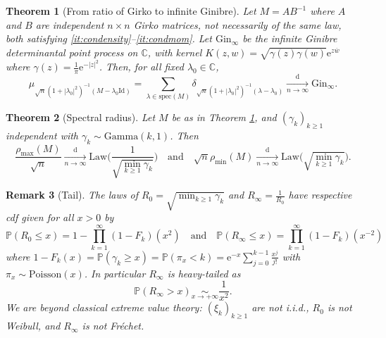 \documentclass[10pt,reqno]{amsart}
\newcommand{\dd}{\mathrm{d}}
\newcommand{\<}{\langle}
\renewcommand{\>}{\rangle}
\numberwithin{equation}{section}
\newtheorem{theorem}{Theorem}[section]%
\newtheorem{remark}[theorem]{Remark}%
\begin{document}
\begin{theorem}[From ratio of Girko to infinite Ginibre]\label{th:spherical:girko:gininf}
 Let $M=AB^{-1}$ where $A$ and $B$ are independent $n\times n$ Girko matrices, not necessarily of the same law, both satisfying \ref{it:condensity}--\ref{it:condmom}. Let $\mathrm{Gin}_\infty$ be the infinite Ginibre determinantal point process on $\mathbb{C}$, with kernel 
 $K(z,w)=\sqrt{\gamma(z)\gamma(w)}\mathrm{e}^{z\overline{w}}$ where $\gamma(z)=\frac{1}{\pi}\mathrm{e}^{-|z|^2}$. 
 Then, for all fixed $\lambda_0 \in \mathbb C$, %
    \[
    \mu_{\sqrt{n}(1+|\lambda_0|^2)^{-1}(M-\lambda_0\mathrm{Id})}=\sum_{\lambda\in\mathrm{spec}(M)}\delta_{\sqrt{n}(1+|\lambda_0|^2)^{-1}(\lambda - \lambda_0)}
    \xrightarrow[n\to\infty]{\dd}
    \mathrm{Gin}_\infty.
    \]
\end{theorem}


\begin{theorem}[Spectral radius]\label{th:spherical:girko:rho}
 Let $M$ be as in Theorem \ref{th:spherical:girko:gininf}, and ${(\gamma_k)}_{k\geq1}$ independent with $\gamma_k\sim\mathrm{Gamma}(k,1)$. Then
 \begin{equation}\label{eq:spherical:girko:rho}
    \frac{\rho_{\max}(M)}{\sqrt{n}} 
    \xrightarrow[n\to\infty]{\dd}
    \mathrm{Law}\Bigr(\frac{1}{\sqrt{\min_{k\geq1}\gamma_k}}\Bigr)
    \quad\text{and}\quad
    \sqrt{n}\rho_{\min}(M)
    \xrightarrow[n\to\infty]{\dd}
    \mathrm{Law}\bigr(\sqrt{\min_{k\geq1}\gamma_k}\bigr).
 \end{equation}
\end{theorem}

\begin{remark}[Tail]
The laws of $R_0=\sqrt{\min_{k\geq1}\gamma_k}$ and $R_\infty=\displaystyle\frac{1}{R_0}$ have respective cdf given for all $x>0$ by 
\begin{equation}\label{eq:cdf}
 \mathbb{P}(R_0\leq x)
 =1-\prod_{k=1}^\infty (1-F_k)(x^2)
 \quad\text{and}\quad
 \mathbb{P}(R_\infty\leq x)
 =\prod_{k=1}^\infty (1-F_k)(x^{-2})
\end{equation}
where 
$1-F_k(x)=\mathbb{P}(\gamma_k\geq x)=\mathbb{P}(\pi_x<k)=\mathrm{e}^{-x}\sum_{j=0}^{k-1}\frac{x^{j}}{j!}$
with $\pi_x\sim\mathrm{Poisson}(x)$.
In particular $R_\infty$ is heavy-tailed as 
\begin{equation}
\mathbb{P}(R_\infty>x)\underset{x\to+\infty}{\sim}\frac{1}{x^2}.    
\end{equation}
We are beyond classical extreme value theory: ${(\xi_k)}_{k\geq1}$ are not i.i.d., $R_0$ is not Weibull, and $R_\infty$ is not Fréchet.
\end{remark}
\end{document}
